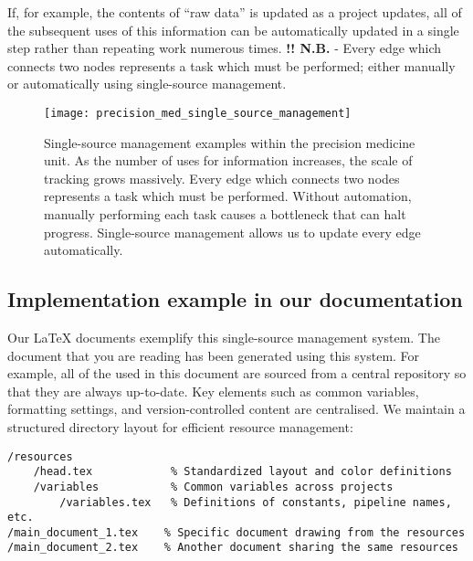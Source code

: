 If, for example, the contents of ``raw data'' is updated as a project updates, all of the subsequent uses of this information can be automatically updated in a single step rather than repeating work numerous times. 
\textbf{!! N.B. } - Every edge which connects two nodes represents a task which must be performed; either manually or automatically using single-source management. 

\begin{figure}[h] \hspace*{0cm} 
\begin{center}
	\texttt{[image: precision\_med\_single\_source\_management]}
	\caption{Single-source management examples within the precision medicine unit. As the number of uses for information increases, the scale of tracking grows massively.  Every edge which connects two nodes represents a task which must be performed. Without automation, manually performing each task causes a bottleneck that can halt progress. 
	Single-source management allows us to update every edge automatically.}
	\label{fig:precision_med_single_source_management}
\end{center}
\end{figure}



\subsection{Implementation example in our documentation}

Our LaTeX documents exemplify this single-source management system. 
The document that you are reading has been generated using this system. 
For example, all of the  used in this document are sourced from a central repository so that they are always up-to-date.
Key elements such as common variables, formatting settings, and version-controlled content are centralised. 
We maintain a structured directory layout for efficient resource management:

\begin{verbatim}
/resources
    /head.tex            % Standardized layout and color definitions
    /variables           % Common variables across projects
        /variables.tex   % Definitions of constants, pipeline names, etc.
/main_document_1.tex    % Specific document drawing from the resources
/main_document_2.tex    % Another document sharing the same resources
\end{verbatim}

